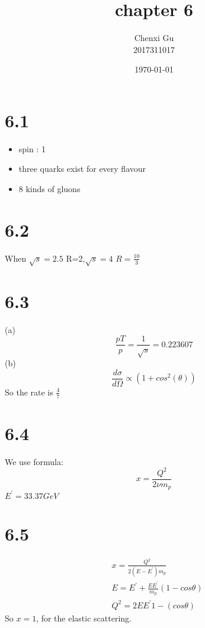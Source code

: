 \documentclass{article}
\begin{document}
\begin{CJK*}{GBK}{song}

\pagestyle{fancy}  
\fancyhead{} %
\renewcommand{\headrulewidth}{0.4pt}  
\renewcommand{\footrulewidth}{0.4pt} 



\title {chapter 6}
\author{Chenxi Gu\\2017311017}

\date{\today}

\maketitle
\section{6.1}
\begin{itemize}
\item spin : 1
\item three quarks exist for every flavour
\item 8 kinds of gluons
\end{itemize}

\section{6.2}
When $\sqrt{s}=2.5$ R=2,$\sqrt{s}=4$ $R=\frac{10}{3}$

\section{6.3}
(a)
\begin{equation}
\frac{pT}{p}=\frac{1}{\sqrt{s}}=0.223607
\end{equation}
(b)
\begin{equation}
\frac{d\sigma}{d\Omega}\propto(1+cos^2(\theta))
\end{equation}
So the rate is $\frac{4}{7}$

\section{6.4}
We use formula:
\begin{equation}
x=\frac{Q^2}{2\nu m_p}
\end{equation}
$E^{'}=33.37GeV$
\section{6.5}
\begin{equation}
\begin{aligned}
&x=\frac{Q^2}{2(E-E^{'})m_p}\\
&E=E^{'}+\frac{EE^{'}}{m_p}(1-cos\theta)\\
&Q^2=2EE^{'}1-(cos\theta)
\end{aligned}
\end{equation}
So $x=1$, for the elastic scattering.


\end{CJK*}
\end{document}

